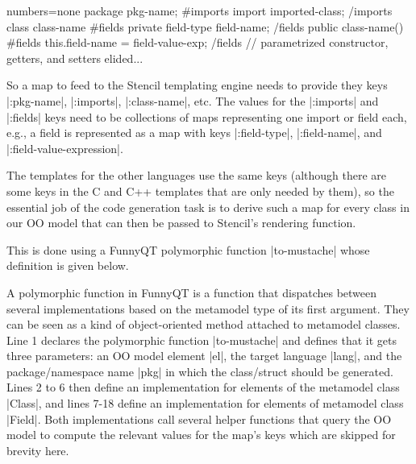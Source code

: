 \documentclass[submission]{eptcs}
\newcommand{\code}{\clojureinline}
\begin{document}
\begin{javacode*}{numbers=none}
package {{{pkg-name}}};
{{#imports}}
import {{{imported-class}}};
{{/imports}}
class {{{class-name}}} {
    {{#fields}}
    private {{{field-type}}} {{{field-name}}};
    {{/fields}}
    public {{{class-name}}}() {
        {{#fields}}
        this.{{{field-name}}} = {{{field-value-exp}}};
        {{/fields}}
    }
    // parametrized constructor, getters, and setters elided...
}
\end{javacode*}

So a map to feed to the Stencil templating engine needs to provide they keys
\code|:pkg-name|, \code|:imports|, \code|:class-name|, etc.  The values for the
\code|:imports| and \code|:fields| keys need to be collections of maps
representing one import or field each, e.g., a field is represented as a map
with keys \code|:field-type|, \code|:field-name|, and
\code|:field-value-expression|.

The templates for the other languages use the same keys (although there are
some keys in the C and C++ templates that are only needed by them), so the
essential job of the code generation task is to derive such a map for every
class in our OO model that can then be passed to Stencil's rendering function.

This is done using a FunnyQT polymorphic function \code|to-mustache| whose
definition is given below.


A polymorphic function in FunnyQT is a function that dispatches between several
implementations based on the metamodel type of its first argument.  They can be
seen as a kind of object-oriented method attached to metamodel classes.  Line 1
declares the polymorphic function \code|to-mustache| and defines that it gets
three parameters: an OO model element \code|el|, the target language
\code|lang|, and the package/namespace name \code|pkg| in which the
class/struct should be generated.  Lines 2 to 6 then define an implementation
for elements of the metamodel class \code|Class|, and lines 7-18 define an
implementation for elements of metamodel class \code|Field|.  Both
implementations call several helper functions that query the OO model to
compute the relevant values for the map's keys which are skipped for brevity
here.
\end{document}
